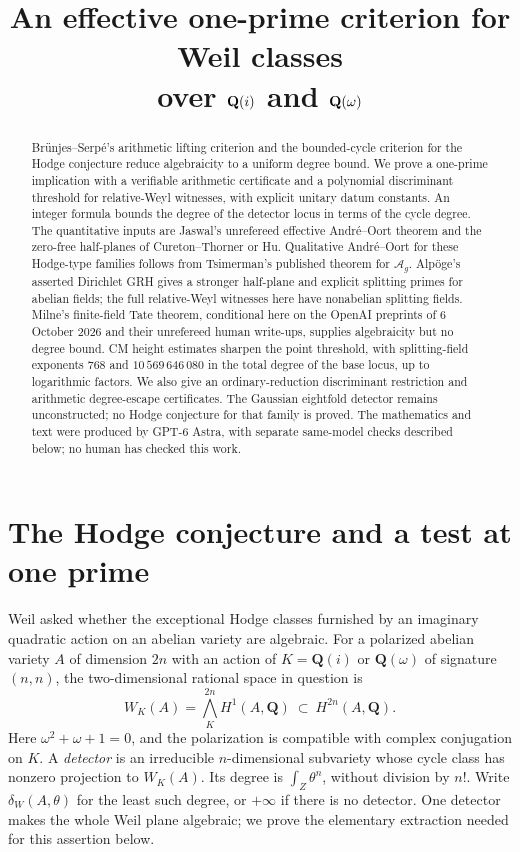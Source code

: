 \documentclass[11pt]{article}
\title{An effective one-prime criterion for Weil classes\\over $\Q(i)$ and $\Q(\omega)$}
\author{}
\date{}
\theoremstyle{definition}
\theoremstyle{remark}
\newcommand{\Q}{\mathbf Q}
\begin{document}
\maketitle
\begin{abstract}
Br\"unjes--Serp\'e's arithmetic lifting criterion and the bounded-cycle
criterion for the Hodge conjecture reduce algebraicity to a uniform
degree bound. We prove a one-prime implication with a verifiable
arithmetic certificate and a polynomial discriminant threshold for
relative-Weyl witnesses, with explicit unitary datum constants. An integer formula bounds
the degree of the detector locus in terms of the cycle degree.
The quantitative inputs are Jaswal's unrefereed effective
Andr\'e--Oort theorem and the zero-free half-planes of
Cureton--Thorner or Hu. Qualitative Andr\'e--Oort for these Hodge-type families follows
from Tsimerman's published theorem for $\mathcal A_g$. Alp\"oge's asserted Dirichlet
GRH gives a stronger half-plane and explicit splitting primes for
abelian fields; the full relative-Weyl witnesses here have
nonabelian splitting fields. Milne's finite-field Tate theorem,
conditional here on the OpenAI preprints of 6 October 2026 and their
unrefereed human write-ups, supplies algebraicity but no degree bound.
CM height estimates sharpen the point threshold, with splitting-field
exponents $768$ and $10\,569\,646\,080$ in the total degree of the
base locus, up to logarithmic factors. We also give an ordinary-reduction
discriminant restriction and arithmetic degree-escape certificates.
The Gaussian eightfold detector remains unconstructed; no Hodge
conjecture for that family is proved. The mathematics and text were
produced by GPT-6 Astra, with separate same-model checks described
below; no human has checked this work.
\end{abstract}

\section{The Hodge conjecture and a test at one prime}

Weil asked whether the exceptional Hodge classes furnished by an
imaginary quadratic action on an abelian variety are algebraic.
For a polarized abelian variety $A$ of dimension $2n$ with an action
of $K=\Q(i)$ or $\Q(\omega)$ of signature $(n,n)$, the two-dimensional
rational space in question is
\[
 W_K(A)=\bigwedge_K^{2n}H^1(A,\Q)\ \subset\ H^{2n}(A,\Q).
\]
Here $\omega^2+\omega+1=0$, and the polarization is compatible with
complex conjugation on $K$. A \emph{detector} is an irreducible
$n$-dimensional subvariety whose cycle class has nonzero projection
to $W_K(A)$. Its degree is $\int_Z\theta^n$, without division by
$n!$. Write $\delta_W(A,\theta)$ for the least such degree, or
$+\infty$ if there is no detector. One detector makes the whole
Weil plane algebraic; we prove the elementary extraction needed
for this assertion below.
\end{document}
